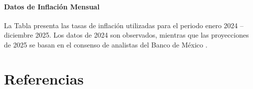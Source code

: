 \documentclass[
  spanish,
  us-letterpaper,
]{scrreprt}
\newcounter{none} %
\theoremstyle{plain}
\theoremstyle{plain}
\theoremstyle{definition}
\theoremstyle{remark}
\begin{document}
\subsubsection{Datos de Inflación
Mensual}\label{datos-de-inflaciuxf3n-mensual}

La Tabla presenta las tasas de inflación utilizadas para el periodo
enero 2024 -- diciembre 2025. Los datos de 2024 son observados, mientras
que las proyecciones de 2025 se basan en el consenso de analistas del
Banco de México \textcite{banxico2024expectativas}.


\chapter{}\label{section}


\chapter{}\label{section-1}


\chapter*{Referencias}\label{referencias}


\printbibliography[heading=none]
\end{document}

